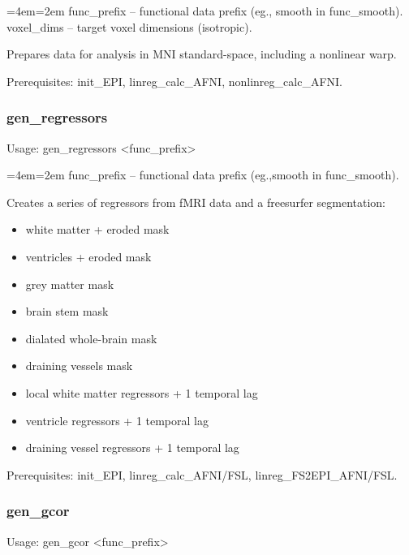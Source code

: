 \documentclass[final,titlepage,letterpaper,oneside,12pt]{article}
\renewcommand{\texttt}[2][BrickRed]{\textcolor{#1}{\ttfamily #2}}%
\newenvironment{blockquote}{%
  \par%
  \medskip
  \leftskip=4em\rightskip=2em%
  \noindent\ignorespaces}{%
  \par\medskip}
\begin{document}
\begin{blockquote}
func\_prefix -- functional data prefix (eg., smooth in func\_smooth). \\
voxel\_dims -- target voxel dimensions (isotropic). \
\end{blockquote}

\noindent Prepares data for analysis in MNI standard-space, including a nonlinear warp.

Prerequisites: \texttt{init\_EPI}, \texttt{linreg\_calc\_AFNI}, \texttt{nonlinreg\_calc\_AFNI}.

\subsubsection{gen\_regressors}
Usage: \texttt{gen\_regressors <func\_prefix>}

\begin{blockquote}
func\_prefix -- functional data prefix (eg.,smooth in func\_smooth).
\end{blockquote}

\noindent Creates a series of regressors from fMRI data and a freesurfer segmentation: 

\begin{itemize} \itemsep-2pt
	\item{white matter + eroded mask}
	\item{ventricles + eroded mask}
	\item{grey matter mask}
	\item{brain stem mask}
	\item{dialated whole-brain mask}
	\item{draining vessels mask}
	\item{local white matter regressors + 1 temporal lag}
	\item{ventricle regressors + 1 temporal lag}
	\item{draining vessel regressors + 1 temporal lag}
\end{itemize}

Prerequisites: \texttt{init\_EPI}, \texttt{linreg\_calc\_AFNI/FSL}, \texttt{linreg\_FS2EPI\_AFNI/FSL}.

\subsubsection{gen\_gcor}
Usage: \texttt{gen\_gcor <func\_prefix>}
\end{document}
